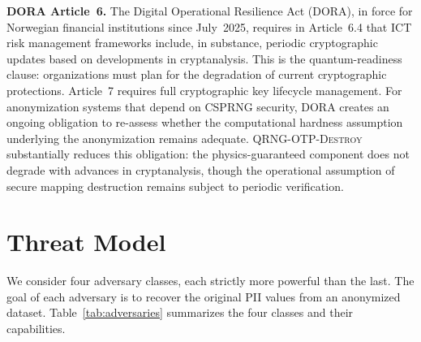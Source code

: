 \documentclass[journal]{IEEEtran}
\begin{document}
\textbf{DORA Article~6.} The Digital Operational Resilience Act (DORA), in force for Norwegian financial institutions since July~2025, requires in Article~6.4 that ICT risk management frameworks include, in substance, periodic cryptographic updates based on developments in cryptanalysis. This is the quantum-readiness clause: organizations must plan for the degradation of current cryptographic protections. Article~7 requires full cryptographic key lifecycle management. For anonymization systems that depend on CSPRNG security, DORA creates an ongoing obligation to re-assess whether the computational hardness assumption underlying the anonymization remains adequate. \textsc{QRNG-OTP-Destroy} substantially reduces this obligation: the physics-guaranteed component does not degrade with advances in cryptanalysis, though the operational assumption of secure mapping destruction remains subject to periodic verification.

\section{Threat Model}
\label{sec:threat}

We consider four adversary classes, each strictly more powerful than the last. The goal of each adversary is to recover the original PII values from an anonymized dataset. Table~\ref{tab:adversaries} summarizes the four classes and their capabilities.
\end{document}
